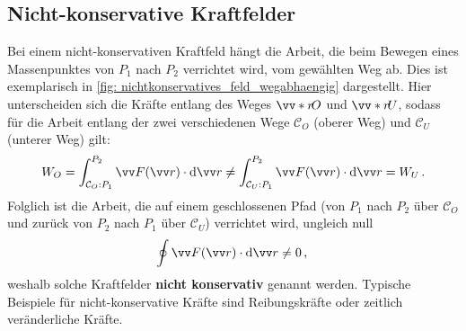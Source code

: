 \subsection{Nicht-konservative Kraftfelder}\label{subsec: nicht-konservative_kraftfelder}
Bei einem nicht-konservativen Kraftfeld hängt die Arbeit, die beim Bewegen eines Massenpunktes von $P_1$ nach $P_2$ verrichtet wird, vom gewählten Weg ab. Dies ist exemplarisch in \cref{fig: nichtkonservatives_feld_wegabhaengig} dargestellt. Hier unterscheiden sich die Kräfte entlang des Weges $\ivecS{r}{O}$ und $\ivecS{r}{U}$, sodass für die Arbeit entlang der zwei verschiedenen Wege $\mathcal{C}_O$ (oberer Weg) und $\mathcal{C}_U$ (unterer Weg) gilt: 
\begin{equation}\label{eq: arbeit_nicht_konservativ}
    W_O = \int_{\mathcal{C}_O: P_1}^{P_2} \ivec{F}(\ivec{r}) \cdot \dd\ivec{r} \neq \int_{\mathcal{C}_U: P_1}^{P_2} \ivec{F}(\ivec{r}) \cdot \dd\ivec{r} = W_U \mDot
\end{equation}
Folglich ist die Arbeit, die auf einem geschlossenen Pfad (\zB von $P_1$ nach $P_2$ über $\mathcal{C}_O$ und zurück von $P_2$ nach $P_1$ über $\mathcal{C}_U$) verrichtet wird, ungleich null
\begin{equation}\label{eq: arbeit_nicht_konservativ_geschlossen}
    \oint \ivec{F}(\ivec{r}) \cdot \dd\ivec{r} \neq 0 \mComma
\end{equation}
weshalb solche Kraftfelder \textbf{nicht konservativ} genannt werden. Typische Beispiele für nicht-konservative Kräfte sind Reibungskräfte oder zeitlich veränderliche Kräfte.
